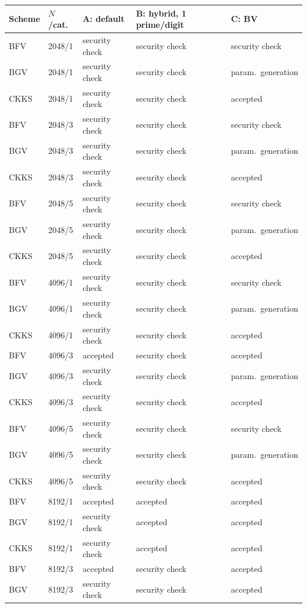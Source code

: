 \begin{longtable}{@{}lllll@{}}
\toprule
Scheme & $N$/cat. & A: default & B: hybrid, 1 prime/digit & C: BV \\
\midrule
\endhead
BFV & 2048/1 & security check & security check & security check \\
BGV & 2048/1 & security check & security check & param.\ generation \\
CKKS & 2048/1 & security check & security check & accepted \\
BFV & 2048/3 & security check & security check & security check \\
BGV & 2048/3 & security check & security check & param.\ generation \\
CKKS & 2048/3 & security check & security check & accepted \\
BFV & 2048/5 & security check & security check & security check \\
BGV & 2048/5 & security check & security check & param.\ generation \\
CKKS & 2048/5 & security check & security check & accepted \\
BFV & 4096/1 & security check & security check & security check \\
BGV & 4096/1 & security check & security check & param.\ generation \\
CKKS & 4096/1 & security check & security check & accepted \\
BFV & 4096/3 & accepted & security check & accepted \\
BGV & 4096/3 & security check & security check & param.\ generation \\
CKKS & 4096/3 & security check & security check & accepted \\
BFV & 4096/5 & security check & security check & security check \\
BGV & 4096/5 & security check & security check & param.\ generation \\
CKKS & 4096/5 & security check & security check & accepted \\
BFV & 8192/1 & accepted & accepted & accepted \\
BGV & 8192/1 & security check & accepted & accepted \\
CKKS & 8192/1 & security check & accepted & accepted \\
BFV & 8192/3 & accepted & security check & accepted \\
BGV & 8192/3 & security check & security check & accepted \\

\end{longtable}
